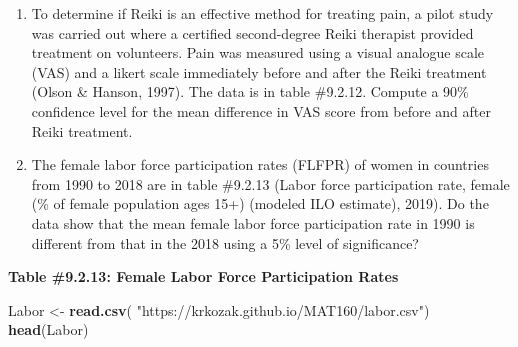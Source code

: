 \documentclass[
]{book}
\newenvironment{Shaded}{\begin{snugshade}}{\end{snugshade}}
\newcommand{\KeywordTok}[1]{\textcolor[rgb]{0.13,0.29,0.53}{\textbf{#1}}}
\newcommand{\NormalTok}[1]{#1}
\newcommand{\StringTok}[1]{\textcolor[rgb]{0.31,0.60,0.02}{#1}}
\begin{document}
\begin{enumerate}
\def\labelenumi{\arabic{enumi}.}
\setcounter{enumi}{7}
\item
  To determine if Reiki is an effective method for treating pain, a pilot study was carried out where a certified second-degree Reiki therapist provided treatment on volunteers. Pain was measured using a visual analogue scale (VAS) and a likert scale immediately before and after the Reiki treatment (Olson \& Hanson, 1997). The data is in table \#9.2.12. Compute a 90\% confidence level for the mean difference in VAS score from before and after Reiki treatment.
\item
  The female labor force participation rates (FLFPR) of women in countries from 1990 to 2018 are in table \#9.2.13 (Labor force participation rate, female (\% of female population ages 15+) (modeled ILO estimate), 2019). Do the data show that the mean female labor force participation rate in 1990 is different from that in the 2018 using a 5\% level of significance?
\end{enumerate}

\textbf{Table \#9.2.13: Female Labor Force Participation Rates}

\begin{Shaded}
\begin{Highlighting}[]
\NormalTok{Labor <-}\StringTok{ }\KeywordTok{read.csv}\NormalTok{(}
  \StringTok{"https://krkozak.github.io/MAT160/labor.csv"}\NormalTok{)}
\KeywordTok{head}\NormalTok{(Labor)}
\end{Highlighting}
\end{Shaded}
\end{document}
